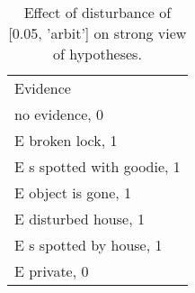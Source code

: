 \begin{table}\begin{tabular}{l}\toprule\multirow{2}{*}{Evidence} \\\\\midrule
no evidence, 0 & \\E broken lock, 1 & \\E s spotted with goodie, 1 & \\E object is gone, 1 & \\E disturbed house, 1 & \\E s spotted by house, 1 & \\E private, 0 & \\\bottomrule\end{tabular}\caption{Effect of disturbance of [0.05, 'arbit'] on strong view of hypotheses.}\end{table}